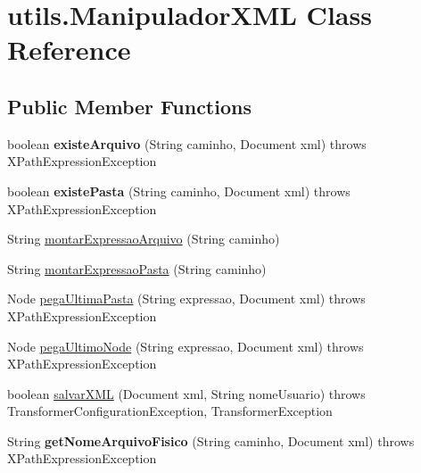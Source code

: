 \hypertarget{classutils_1_1_manipulador_x_m_l}{\section{utils.\+Manipulador\+X\+M\+L Class Reference}
\label{classutils_1_1_manipulador_x_m_l}
}
\subsection*{Public Member Functions}
\begin{DoxyCompactItemize}
\item 
\hypertarget{classutils_1_1_manipulador_x_m_l_a16a656452f4175f6429248f48e9e287f}{boolean {\bfseries existe\+Arquivo} (String caminho, Document xml)  throws X\+Path\+Expression\+Exception }\label{classutils_1_1_manipulador_x_m_l_a16a656452f4175f6429248f48e9e287f}

\item 
\hypertarget{classutils_1_1_manipulador_x_m_l_ad6c6eea5fc2af5a388ba9dc89c5ac58d}{boolean {\bfseries existe\+Pasta} (String caminho, Document xml)  throws X\+Path\+Expression\+Exception }\label{classutils_1_1_manipulador_x_m_l_ad6c6eea5fc2af5a388ba9dc89c5ac58d}

\item 
String \hyperlink{classutils_1_1_manipulador_x_m_l_abe6e542a9eaaae635a8a170b82440386}{montar\+Expressao\+Arquivo} (String caminho)
\item 
String \hyperlink{classutils_1_1_manipulador_x_m_l_a0c3294fa3f4ac2d40a6f544528acef53}{montar\+Expressao\+Pasta} (String caminho)
\item 
Node \hyperlink{classutils_1_1_manipulador_x_m_l_a0f077a38689257b4531ffc9068c9fe72}{pega\+Ultima\+Pasta} (String expressao, Document xml)  throws X\+Path\+Expression\+Exception 
\item 
Node \hyperlink{classutils_1_1_manipulador_x_m_l_a3722abbe1d67ed059d767625f145890c}{pega\+Ultimo\+Node} (String expressao, Document xml)  throws X\+Path\+Expression\+Exception 
\item 
boolean \hyperlink{classutils_1_1_manipulador_x_m_l_a8313756ee8243de3d89c2cb3ec3136ed}{salvar\+X\+M\+L} (Document xml, String nome\+Usuario)  throws Transformer\+Configuration\+Exception, Transformer\+Exception 
\item 
\hypertarget{classutils_1_1_manipulador_x_m_l_a508d4e44cb77093a9674a23aa47070f4}{String {\bfseries get\+Nome\+Arquivo\+Fisico} (String caminho, Document xml)  throws X\+Path\+Expression\+Exception }\label{classutils_1_1_manipulador_x_m_l_a508d4e44cb77093a9674a23aa47070f4}

\end{DoxyCompactItemize}
